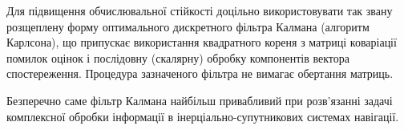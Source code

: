 Для підвищення обчислювальної стійкості  доцільно використовувати так звану розщеплену форму оптимального дискретного фільтра Калмана (алгоритм Карлсона), що припускає використання квадратного кореня з матриці коваріації помилок оцінок і послідовну (скалярну) обробку компонентів вектора спостереження. Процедура зазначеного фільтра не вимагає обертання матриць.

Безперечно саме фільтр Калмана найбільш привабливий при розв’язанні задачі комплексної обробки інформації в інерціально-супутникових системах навігації.


